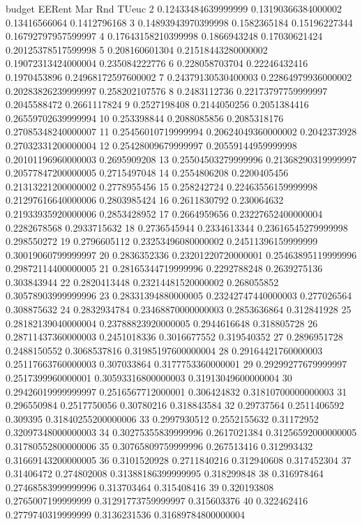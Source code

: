 budget EERent Mar Rnd TUeuc
2 0.12433484639999999 0.13190366384000002 0.13416566064 0.1412796168
3 0.14893943970399998 0.1582365184 0.15196227344 0.16792797957599997
4 0.17643158210399998 0.1866943248 0.17030621424 0.20125378517599998
5 0.208160601304 0.21518443280000002 0.19072313424000004 0.235084222776
6 0.228058703704 0.22246432416 0.1970453896 0.24968172597600002
7 0.24379130530400003 0.22864979936000002 0.20283826239999997 0.258202107576
8 0.2483112736 0.22173797759999997 0.2045588472 0.2661117824
9 0.2527198408 0.2144050256 0.2051384416 0.26559702639999994
10 0.253398844 0.2088085856 0.2085318176 0.27085348240000007
11 0.25456010719999994 0.20624049360000002 0.2042373928 0.27032331200000004
12 0.25428009679999997 0.20559144959999998 0.20101196960000003 0.2695909208
13 0.25504503279999996 0.21368290319999997 0.20577847200000005 0.2715497048
14 0.2554806208 0.2200405456 0.21313221200000002 0.2778955456
15 0.258242724 0.22463556159999998 0.21297616640000006 0.2803985424
16 0.2611830792 0.230064632 0.21933935920000006 0.2853428952
17 0.2664959656 0.23227652400000004 0.2282678568 0.2933715632
18 0.2736545944 0.2334613344 0.23616545279999998 0.298550272
19 0.2796605112 0.23253496080000002 0.24511396159999999 0.30019060799999997
20 0.2836352336 0.23201220720000001 0.25463895119999996 0.29872114400000005
21 0.28165344719999996 0.2292788248 0.2639275136 0.303843944
22 0.2820413448 0.23214481520000002 0.268055852 0.30578903999999996
23 0.28331394880000005 0.23242747440000003 0.277026564 0.308875632
24 0.2832934784 0.23468870000000003 0.2853636864 0.312841928
25 0.28182139040000004 0.23788823920000005 0.2944616648 0.318805728
26 0.28711437360000003 0.2451018336 0.3016677552 0.319540352
27 0.2896951728 0.2488150552 0.3068537816 0.31985197600000004
28 0.29164421760000003 0.25117663760000003 0.307033864 0.3177753360000001
29 0.29299277679999997 0.2517399960000001 0.30593316800000003 0.31913049600000004
30 0.29426019999999997 0.2516567712000001 0.306424832 0.31810700000000003
31 0.296550984 0.2517750056 0.30780216 0.318843584
32 0.29737564 0.2511406592 0.309395 0.31840255200000006
33 0.2997930512 0.2552155632 0.31172952 0.32097348000000003
34 0.30275355839999996 0.2617021384 0.31256592000000005 0.31780552800000006
35 0.30765809759999996 0.267513416 0.312993432 0.31669143200000005
36 0.3101520928 0.2711840216 0.312940608 0.317452304
37 0.31406472 0.274802008 0.31388186399999995 0.318299848
38 0.316978464 0.27468583999999996 0.313703464 0.315408416
39 0.320193808 0.2765007199999999 0.31291773759999997 0.315603376
40 0.322462416 0.2779740319999999 0.3136231536 0.31689784800000004
